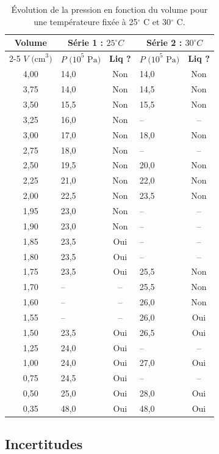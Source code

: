 \documentclass[a4paper,9pt,french]{scrartcl}
\begin{document}
\begin{table}[H]
    \centering
    \small
    \begin{tabular}{|c||lc|lc|}
    \hline
    \textbf{Volume} & \multicolumn{2}{c|}{\textbf{Série 1 : $25^\circ C$}} & \multicolumn{2}{c|}{\textbf{Série 2 : $30^\circ C$}} \\ 
    \cline{2-5}
    $V \text{ (cm}^3\text{)}$ & $P \text{ (10}^5\text{ Pa)}$ & \textbf{Liq ?} & $P \text{ (10}^5\text{ Pa)}$ & \textbf{Liq ?} \\ 
    \hline
    4,00 & 14,0 & Non & 14,0 & Non \\
    3,75 & 14,0 & Non & 14,5 & Non \\
    3,50 & 15,5 & Non & 15,5 & Non \\
    3,25 & 16,0 & Non & --   & --  \\
    3,00 & 17,0 & Non & 18,0 & Non \\
    2,75 & 18,0 & Non & --   & --  \\
    2,50 & 19,5 & Non & 20,0 & Non \\
    2,25 & 21,0 & Non & 22,0 & Non \\
    2,00 & 22,5 & Non & 23,5 & Non \\
    1,95 & 23,0 & Non & --   & --  \\
    1,90 & 23,0 & Non & --   & --  \\
    1,85 & 23,5 & Oui & --   & --  \\
    1,80 & 23,5 & Oui & --   & --  \\
    1,75 & 23,5 & Oui & 25,5 & Non \\
    1,70 & --   & --  & 25,5 & Non \\
    1,60 & --   & --  & 26,0 & Non \\
    1,55 & --   & --  & 26,0 & Oui \\
    1,50 & 23,5 & Oui & 26,5 & Oui \\
    1,25 & 24,0 & Oui & --   & --  \\
    1,00 & 24,0 & Oui & 27,0 & Oui \\
    0,75 & 24,5 & Oui & --   & --  \\
    0,50 & 25,0 & Oui & 28,0 & Oui \\
    0,35 & 48,0 & Oui & 48,0 & Oui \\
    \hline
    \end{tabular}
    \caption{Évolution de la pression en fonction du volume pour une températeure fixée à 25$^\circ$ C et 30$^\circ$ C.}
\end{table}
\subsection{Incertitudes}
\end{document}

